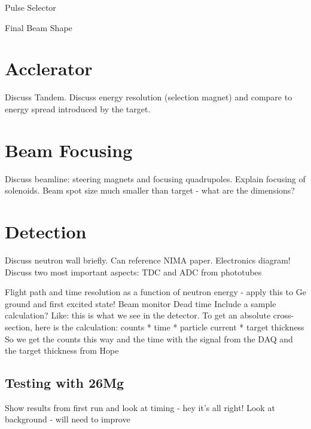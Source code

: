 Pulse Selector

Final Beam Shape

\section{Acclerator}
Discuss Tandem.  Discuss energy resolution (selection magnet) and compare to energy spread introduced by the target.

\section{Beam Focusing}
Discuss beamline: steering magnets and focusing quadrupoles.
Explain focusing of solenoids.
Beam spot size much smaller than target - what are the dimensions?

\section{Detection}
Discuss neutron wall briefly.  Can reference NIMA paper.  
Electronics diagram!  Discuss two most important aspects: TDC and ADC from phototubes

Flight path and time resolution as a function of neutron energy - apply this to Ge ground and first excited state!
Beam monitor
Dead time
Include a sample calculation?  Like: this is what we see in the detector.  To get an absolute cross-section, here is the calculation:
counts * time * particle current * target thickness
So we get the counts this way and the time with the signal from the DAQ and the target thickness from Hope

\subsection{Testing with 26Mg}
Show results from first run and look at timing - hey it's all right!
Look at background - will need to improve

%
% 
% 
